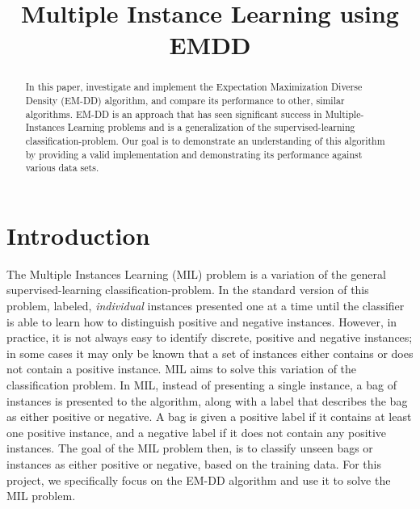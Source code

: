 \documentclass[conference]{IEEEtran}
\begin{document}
\title{Multiple Instance Learning using EMDD}

\author{
\and
{}
}

\maketitle

\begin{abstract}
In this paper, investigate and implement the Expectation Maximization Diverse Density (EM-DD)\cite{zhang2001dd} algorithm, and compare its performance to other, similar algorithms. EM-DD is an approach that has seen significant success in Multiple-Instances Learning problems and is a generalization of the supervised-learning classification-problem. Our goal is to demonstrate an understanding of this algorithm by providing a valid implementation and demonstrating its performance against various data sets.
\end{abstract}


\IEEEpeerreviewmaketitle


\section{Introduction}
The Multiple Instances Learning (MIL) problem\cite{dietterich1997solving} is a variation of the general supervised-learning classification-problem. In the standard version of this problem, labeled, \textit{individual} instances presented one at a time until the classifier is able to learn how to distinguish positive and negative instances. However, in practice, it is not always easy to identify discrete, positive and negative instances; in some cases it may only be known that a set of instances either contains or does not contain a positive instance. MIL aims to solve this variation of the classification problem. In MIL, instead of presenting a single instance, a bag of instances is presented to the algorithm, along with a label that describes the bag as either positive or negative. A bag is given a positive label if it contains at least one positive instance, and a negative label if it does not contain any positive instances. The goal of the MIL problem then, is to classify unseen bags or instances as either positive or negative, based on the training data. For this project, we specifically focus on the EM-DD algorithm and use it to solve the MIL problem. 
\end{document}
